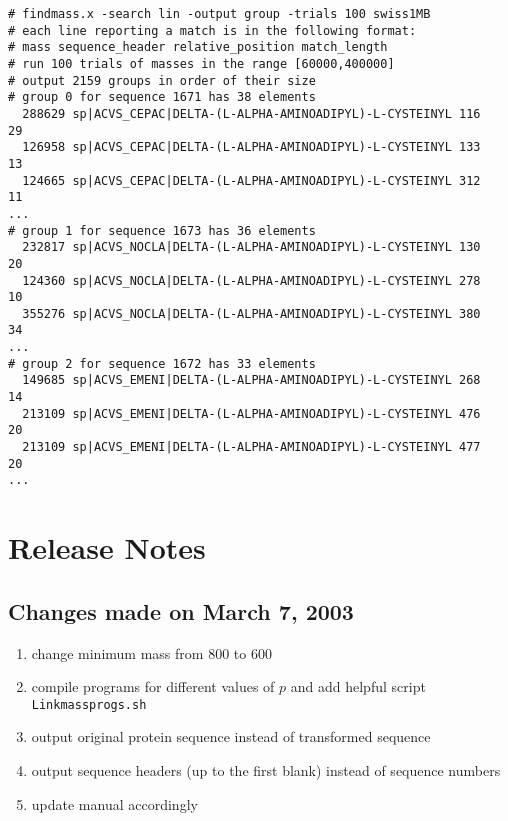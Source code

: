 \documentclass[12pt]{article}
\begin{document}
\begin{footnotesize}
\begin{verbatim}
# findmass.x -search lin -output group -trials 100 swiss1MB
# each line reporting a match is in the following format:
# mass sequence_header relative_position match_length
# run 100 trials of masses in the range [60000,400000]
# output 2159 groups in order of their size
# group 0 for sequence 1671 has 38 elements
  288629 sp|ACVS_CEPAC|DELTA-(L-ALPHA-AMINOADIPYL)-L-CYSTEINYL 116   29
  126958 sp|ACVS_CEPAC|DELTA-(L-ALPHA-AMINOADIPYL)-L-CYSTEINYL 133   13
  124665 sp|ACVS_CEPAC|DELTA-(L-ALPHA-AMINOADIPYL)-L-CYSTEINYL 312   11
...
# group 1 for sequence 1673 has 36 elements
  232817 sp|ACVS_NOCLA|DELTA-(L-ALPHA-AMINOADIPYL)-L-CYSTEINYL 130   20
  124360 sp|ACVS_NOCLA|DELTA-(L-ALPHA-AMINOADIPYL)-L-CYSTEINYL 278   10
  355276 sp|ACVS_NOCLA|DELTA-(L-ALPHA-AMINOADIPYL)-L-CYSTEINYL 380   34
...
# group 2 for sequence 1672 has 33 elements
  149685 sp|ACVS_EMENI|DELTA-(L-ALPHA-AMINOADIPYL)-L-CYSTEINYL 268   14
  213109 sp|ACVS_EMENI|DELTA-(L-ALPHA-AMINOADIPYL)-L-CYSTEINYL 476   20
  213109 sp|ACVS_EMENI|DELTA-(L-ALPHA-AMINOADIPYL)-L-CYSTEINYL 477   20
...
\end{verbatim}
\end{footnotesize}

\section{Release Notes}
\subsection{Changes made on March 7, 2003}
\begin{enumerate}
\item
change minimum mass from 800 to 600
\item
compile programs for different values of \(p\) and add 
helpful script \texttt{Linkmassprogs.sh}
\item
output original protein sequence instead of transformed sequence
\item
output sequence headers (up to the first blank) instead of 
sequence numbers
\item
update manual accordingly
\end{enumerate}
\end{document}
